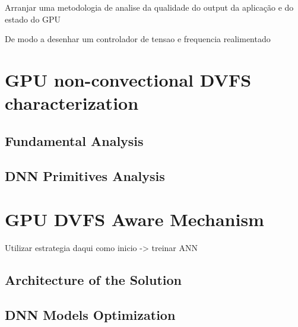 Arranjar uma metodologia de analise da qualidade do output da aplicação e do estado do GPU

De modo a desenhar um controlador de tensao e frequencia realimentado 

\section{GPU non-convectional DVFS characterization}
\subsection{Fundamental Analysis}

\subsection{DNN Primitives Analysis}

\section{GPU DVFS Aware Mechanism}
\label{section:DVFSaware}

Utilizar estrategia daqui como inicio -> treinar ANN
\subsection{Architecture of the Solution}
\label{section:solarch}


\subsection{DNN Models Optimization}